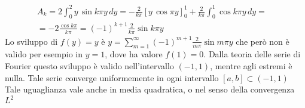 \documentclass[a4paper,12pt, draft]{article}
\theoremstyle{break}
\numberwithin{equation}{section}
\begin{document}
\begin{equation*}
\begin{aligned}
A_k  = 2 \int_0^2 y\, \sin{k \pi y} \, dy = -\frac{2}{k \pi}[y\,  \cos{ \pi y}]_0^1 + \frac{2}{k \pi} \int_0^1 \cos{k \pi y}\, dy = & \\
 =
 -2 \frac{\cos{k \pi}}{k \pi}
 = (-1)^{k+1} \frac{2}{k \pi} \sin {k \pi y}
\end{aligned}
\end{equation*}
Lo sviluppo di $f(y) = y$ è
$y = \sum_{m = 1}^{\infty} (-1)^{m+1} \frac{2}{m \pi} \sin{m \pi y}$
che però non è valido per esempio in $ y = 1$, dove ha valore $f(1) = 0$. Dalla teoria delle serie di Fourier questo sviluppo è valido nell'intervallo $(-1,1)$, mentre agli estremi è nulla. Tale serie converge uniformemente in ogni intervallo $[a,b] \subset (-1,1)$ 
Tale uguaglianza vale anche in media quadratica, o nel senso della convergenza $L^2$  
\end{document}
